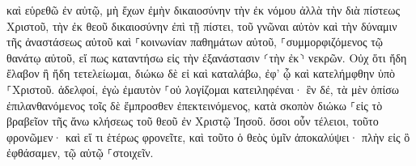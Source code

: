 \documentclass{openreader}
\begin{document}
καὶ εὑρεθῶ ἐν αὐτῷ, μὴ ἔχων ἐμὴν δικαιοσύνην τὴν ἐκ νόμου ἀλλὰ τὴν διὰ πίστεως Χριστοῦ, τὴν ἐκ θεοῦ δικαιοσύνην ἐπὶ τῇ πίστει, 
τοῦ γνῶναι αὐτὸν καὶ τὴν δύναμιν τῆς ἀναστάσεως αὐτοῦ καὶ ⸀κοινωνίαν παθημάτων αὐτοῦ, ⸀συμμορφιζόμενος τῷ θανάτῳ αὐτοῦ, 
εἴ πως καταντήσω εἰς τὴν ἐξανάστασιν ⸂τὴν ἐκ⸃ νεκρῶν. 
Οὐχ ὅτι ἤδη ἔλαβον ἢ ἤδη τετελείωμαι, διώκω δὲ εἰ καὶ καταλάβω, ἐφ’ ᾧ καὶ κατελήμφθην ὑπὸ ⸀Χριστοῦ. 
ἀδελφοί, ἐγὼ ἐμαυτὸν ⸀οὐ λογίζομαι κατειληφέναι· ἓν δέ, τὰ μὲν ὀπίσω ἐπιλανθανόμενος τοῖς δὲ ἔμπροσθεν ἐπεκτεινόμενος, 
κατὰ σκοπὸν διώκω ⸀εἰς τὸ βραβεῖον τῆς ἄνω κλήσεως τοῦ θεοῦ ἐν Χριστῷ Ἰησοῦ. 
ὅσοι οὖν τέλειοι, τοῦτο φρονῶμεν· καὶ εἴ τι ἑτέρως φρονεῖτε, καὶ τοῦτο ὁ θεὸς ὑμῖν ἀποκαλύψει· 
πλὴν εἰς ὃ ἐφθάσαμεν, τῷ αὐτῷ ⸀στοιχεῖν. 
\end{document}
